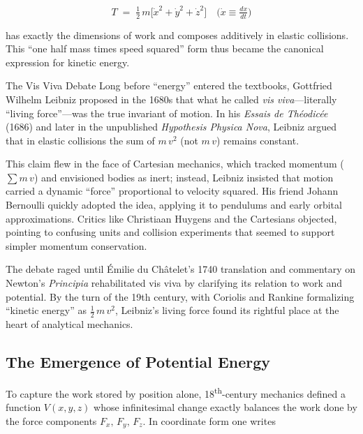 \[
T
\;=\;
\tfrac12\,m\!\bigl[\dot x^2+\dot y^2+\dot z^2\bigr]
\quad\bigl(\dot x\equiv\tfrac{dx}{dt}\bigr)
\]

has exactly the dimensions of work and composes additively in elastic collisions.  This “one half mass times speed squared” form thus became the canonical expression for kinetic energy.

\medskip

\begin{HistoricalSidebar}{The Vis Viva Debate}
  Long before “energy” entered the textbooks, Gottfried Wilhelm Leibniz proposed in the 1680s that what he called \emph{vis viva}—literally “living force”—was the true invariant of motion.  In his \emph{Essais de Théodicée} (1686) and later in the unpublished \emph{Hypothesis Physica Nova}, Leibniz argued that in elastic collisions the sum of \(m\,v^2\) (not \(m\,v\)) remains constant.  

  \medskip
  
  This claim flew in the face of Cartesian mechanics, which tracked momentum (\(\sum m\,v\)) and envisioned bodies as inert; instead, Leibniz insisted that motion carried a dynamic “force” proportional to velocity squared.  His friend Johann Bernoulli quickly adopted the idea, applying it to pendulums and early orbital approximations.  Critics like Christiaan Huygens and the Cartesians objected, pointing to confusing units and collision experiments that seemed to support simpler momentum conservation.  

  \medskip
  
  The debate raged until Émilie du Châtelet’s 1740 translation and commentary on Newton’s \emph{Principia} rehabilitated vis viva by clarifying its relation to work and potential.  By the turn of the 19th century, with Coriolis and Rankine formalizing “kinetic energy” as \(\tfrac12\,m\,v^2\), Leibniz’s living force found its rightful place at the heart of analytical mechanics.
\end{HistoricalSidebar}


\subsection{The Emergence of Potential Energy}

To capture the work stored by position alone, 18\textsuperscript{th}-century mechanics defined a function \(V(x,y,z)\) whose infinitesimal change exactly balances the work done by the force components \(F_x,\,F_y,\,F_z\).  In coordinate form one writes

